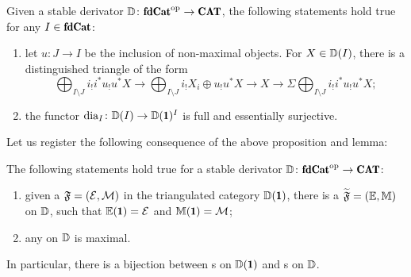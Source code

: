 \begin{proposition}{\rm \cite{Groth_Virili}}
Given a stable derivator $\D\colon \fincat^\opp\to \Cat$, the following statements hold true for any $I\in \fincat$:
\begin{enumerate}
\item let  $u\colon J\to I$ be the inclusion of non-maximal objects. For $X\in \mathbb{D}(I)$, there is a distinguished triangle of the form
\[
\bigoplus_{I\setminus J}i_!i^*u_!u^*X\to \bigoplus_{I\setminus J}i_!X_i\oplus u_!u^*X\to X\to \Sigma \bigoplus_{I\setminus J}i_!i^*u_!u^*X;
\]
\item the functor $\dia_I\colon \D(I)\to \D(\uno)^I$ is full and essentially surjective.
\end{enumerate}
\end{proposition}
Let us register the following consequence of the above proposition and lemma:
\begin{corollary}\label{everything_is_maximal}
The following statements hold true for a stable derivator $\D\colon \fincat^\opp\to \Cat$:
\begin{enumerate}
\item given a {\hfs} $\mathfrak{F}=(\mathcal{E}, \mathcal{M})$ in the triangulated category $\D(\uno)$, there is a \dfs $\widetilde {\mathfrak{F}}=(\mathbb E,\mathbb M)$ on $\mathbb{D}$, such that $\mathbb E(\uno)=\E$ and $\mathbb M(\uno)=\M$;
\item any \dfs on $\mathbb{D}$ is maximal.
\end{enumerate}
In particular, there is a bijection between {\hfs}s on $\D(\uno)$ and {\dfs}s on $\mathbb{D}$. 
\end{corollary}
